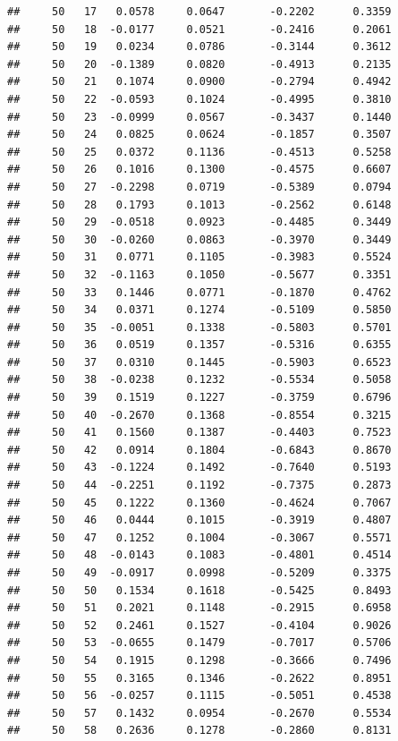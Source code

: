 \documentclass[
]{article}
\begin{document}
\begin{verbatim}
##     50   17   0.0578     0.0647       -0.2202      0.3359 
##     50   18  -0.0177     0.0521       -0.2416      0.2061 
##     50   19   0.0234     0.0786       -0.3144      0.3612 
##     50   20  -0.1389     0.0820       -0.4913      0.2135 
##     50   21   0.1074     0.0900       -0.2794      0.4942 
##     50   22  -0.0593     0.1024       -0.4995      0.3810 
##     50   23  -0.0999     0.0567       -0.3437      0.1440 
##     50   24   0.0825     0.0624       -0.1857      0.3507 
##     50   25   0.0372     0.1136       -0.4513      0.5258 
##     50   26   0.1016     0.1300       -0.4575      0.6607 
##     50   27  -0.2298     0.0719       -0.5389      0.0794 
##     50   28   0.1793     0.1013       -0.2562      0.6148 
##     50   29  -0.0518     0.0923       -0.4485      0.3449 
##     50   30  -0.0260     0.0863       -0.3970      0.3449 
##     50   31   0.0771     0.1105       -0.3983      0.5524 
##     50   32  -0.1163     0.1050       -0.5677      0.3351 
##     50   33   0.1446     0.0771       -0.1870      0.4762 
##     50   34   0.0371     0.1274       -0.5109      0.5850 
##     50   35  -0.0051     0.1338       -0.5803      0.5701 
##     50   36   0.0519     0.1357       -0.5316      0.6355 
##     50   37   0.0310     0.1445       -0.5903      0.6523 
##     50   38  -0.0238     0.1232       -0.5534      0.5058 
##     50   39   0.1519     0.1227       -0.3759      0.6796 
##     50   40  -0.2670     0.1368       -0.8554      0.3215 
##     50   41   0.1560     0.1387       -0.4403      0.7523 
##     50   42   0.0914     0.1804       -0.6843      0.8670 
##     50   43  -0.1224     0.1492       -0.7640      0.5193 
##     50   44  -0.2251     0.1192       -0.7375      0.2873 
##     50   45   0.1222     0.1360       -0.4624      0.7067 
##     50   46   0.0444     0.1015       -0.3919      0.4807 
##     50   47   0.1252     0.1004       -0.3067      0.5571 
##     50   48  -0.0143     0.1083       -0.4801      0.4514 
##     50   49  -0.0917     0.0998       -0.5209      0.3375 
##     50   50   0.1534     0.1618       -0.5425      0.8493 
##     50   51   0.2021     0.1148       -0.2915      0.6958 
##     50   52   0.2461     0.1527       -0.4104      0.9026 
##     50   53  -0.0655     0.1479       -0.7017      0.5706 
##     50   54   0.1915     0.1298       -0.3666      0.7496 
##     50   55   0.3165     0.1346       -0.2622      0.8951 
##     50   56  -0.0257     0.1115       -0.5051      0.4538 
##     50   57   0.1432     0.0954       -0.2670      0.5534 
##     50   58   0.2636     0.1278       -0.2860      0.8131 

\end{verbatim}
\end{document}
